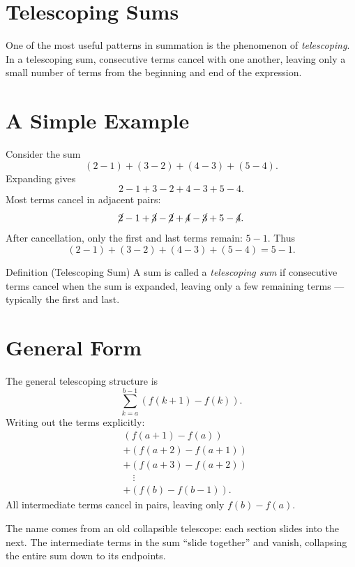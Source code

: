 
\section{Telescoping Sums}
\label{sec:telescoping-sums}

One of the most useful patterns in summation is the phenomenon of
\emph{telescoping}. In a telescoping sum, consecutive terms cancel with
one another, leaving only a small number of terms from the beginning
and end of the expression.

\section*{A Simple Example}

Consider the sum
\[
(2-1) + (3-2) + (4-3) + (5-4).
\]
Expanding gives
\[
2 - 1 + 3 - 2 + 4 - 3 + 5 - 4.
\]
Most terms cancel in adjacent pairs:
\[
\cancel{2} - 1 + \cancel{3} - \cancel{2} + \cancel{4} - \cancel{3} + 5 - \cancel{4}.
\]
After cancellation, only the first and last terms remain: \(5 - 1\).
Thus
\[
(2-1) + (3-2) + (4-3) + (5-4) = 5 - 1.
\]

\begin{definitionbox}{Definition (Telescoping Sum)}
A sum is called a \emph{telescoping sum} if consecutive terms cancel when
the sum is expanded, leaving only a few remaining terms --- typically
the first and last.
\end{definitionbox}
\label{def:telescoping-sum}

\section*{General Form}

The general telescoping structure is
\[
\sum_{k=a}^{b-1} (f(k+1) - f(k)).
\]
Writing out the terms explicitly:
\[
\begin{aligned}
& (f(a+1)-f(a)) \\
& + (f(a+2)-f(a+1)) \\
& + (f(a+3)-f(a+2)) \\
& \quad \vdots \\
& + (f(b)-f(b-1)).
\end{aligned}
\]
All intermediate terms cancel in pairs, leaving only \(f(b) - f(a)\).

\begin{remark*}
The name comes from an old collapsible telescope: each section slides
into the next. The intermediate terms in the sum ``slide together''
and vanish, collapsing the entire sum down to its endpoints.
\end{remark*}
